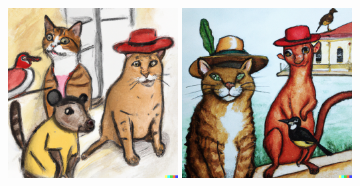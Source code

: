 \documentclass{article}
\newcommand{\imagewidthfactor}{0.4}
\begin{document}
\begin{figure}[h!]
\vspace{1.1em}
\includegraphics[width=\imagewidthfactor\textwidth]{media/8c.png}
\quad
\includegraphics[width=\imagewidthfactor\textwidth]{media/8d.png}
\end{figure}
\end{document}

